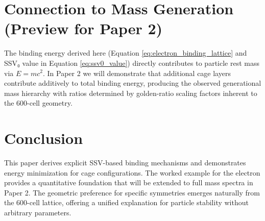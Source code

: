 \documentclass[11pt]{article}
\begin{document}
\section{Connection to Mass Generation (Preview for Paper 2)}

The binding energy derived here (Equation \eqref{eq:electron_binding_lattice} and SSV₀ value in Equation \eqref{eq:ssv0_value}) directly contributes to particle rest mass via $E = mc^2$. In Paper 2 we will demonstrate that additional cage layers contribute additively to total binding energy, producing the observed generational mass hierarchy with ratios determined by golden-ratio scaling factors inherent to the 600-cell geometry.

\section{Conclusion}

This paper derives explicit SSV-based binding mechanisms and demonstrates energy minimization for cage configurations. The worked example for the electron provides a quantitative foundation that will be extended to full mass spectra in Paper 2. The geometric preference for specific symmetries emerges naturally from the 600-cell lattice, offering a unified explanation for particle stability without arbitrary parameters.
\end{document}
